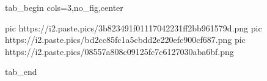  
 
 
 
 


\ifcmt
  tab_begin cols=3,no_fig,center

     pic https://i2.paste.pics/3b823491f01117042231ff2bb961579d.png
		 pic https://i2.paste.pics/bd2cc85fc1a5cbdd2e220efc900cf687.png
		 pic https://i2.paste.pics/08557a808c09125fc7c6127030aba6bf.png

  tab_end
\fi
